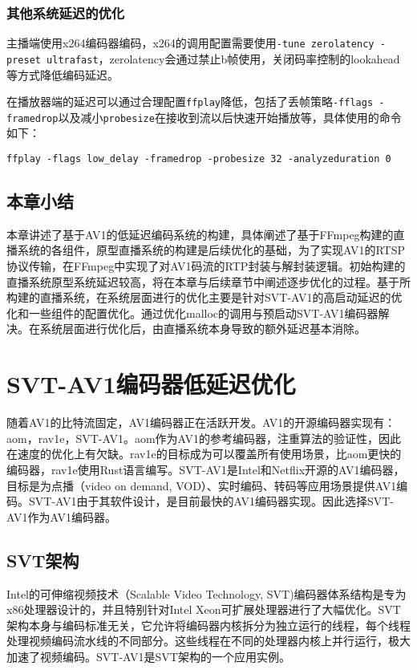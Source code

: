	\subsection{其他系统延迟的优化}

	主播端使用x264编码器编码，x264的调用配置需要使用\texttt{-tune zerolatency -preset ultrafast}，zerolatency会通过禁止b帧使用，关闭码率控制的lookahead等方式降低编码延迟。

	在播放器端的延迟可以通过合理配置\texttt{ffplay}降低，包括了丢帧策略\texttt{-fflags -framedrop}以及减小\texttt{probesize}在接收到流以后快速开始播放等，具体使用的命令如下：

	\texttt{ffplay -flags low\_delay -framedrop -probesize 32 -analyzeduration 0}
\section{本章小结}
  本章讲述了基于AV1的低延迟编码系统的构建，具体阐述了基于FFmpeg构建的直播系统的各组件，原型直播系统的构建是后续优化的基础，为了实现AV1的RTSP协议传输，在FFmpeg中实现了对AV1码流的RTP封装与解封装逻辑。初始构建的直播系统原型系统延迟较高，将在本章与后续章节中阐述逐步优化的过程。基于所构建的直播系统，在系统层面进行的优化主要是针对SVT-AV1的高启动延迟的优化和一些组件的配置优化。通过优化malloc的调用与预启动SVT-AV1编码器解决。在系统层面进行优化后，由直播系统本身导致的额外延迟基本消除。


\chapter{SVT-AV1编码器低延迟优化}
随着AV1的比特流固定，AV1编码器正在活跃开发。AV1的开源编码器实现有：aom\cite{AV1SourceCode2020}，rav1e\cite{barbatoRustAV1Encoder2019}，SVT-AV1\cite{ScalableVideoTechnology2020}。aom作为AV1的参考编码器，注重算法的验证性，因此在速度的优化上有欠缺。rav1e的目标成为可以覆盖所有使用场景，比aom更快的编码器，rav1e使用Rust语言编写。SVT-AV1是Intel和Netflix开源的AV1编码器，目标是为点播（video on demand, VOD）、实时编码、转码等应用场景提供AV1编码。SVT-AV1由于其软件设计，是目前最快的AV1编码器实现。因此选择SVT-AV1作为AV1编码器。
\section{SVT架构}
  Intel的可伸缩视频技术（Scalable Video Technology, SVT\cite{ScalableVideoTechnology2019})编码器体系结构是专为x86处理器设计的，并且特别针对Intel Xeon可扩展处理器进行了大幅优化。SVT架构本身与编码标准无关，它允许将编码器内核拆分为独立运行的线程，每个线程处理视频编码流水线的不同部分。这些线程在不同的处理器内核上并行运行，极大加速了视频编码。SVT-AV1是SVT架构的一个应用实例。

